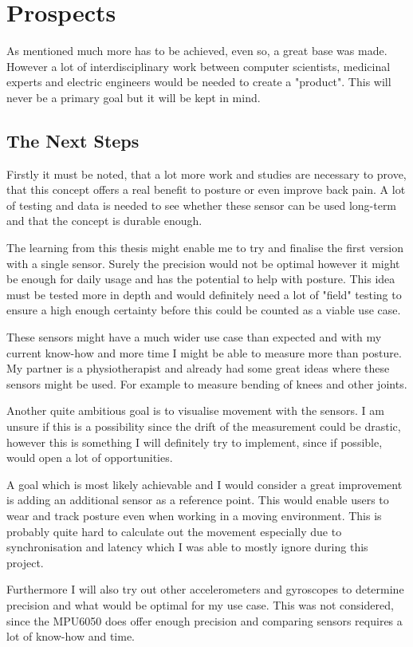 \chapter*{Prospects}
\label{chap:Porspects}
\setcounter{section}{0}

As mentioned much more has to be achieved, even so, a great base was made. However a lot of interdisciplinary work between computer scientists, medicinal experts and electric engineers would be needed to create a "product". This will never be a primary goal but it will be kept in mind.

\section{The Next Steps}

Firstly it must be noted, that a lot more work and studies are necessary to prove, that this concept offers a real benefit to posture or even improve back pain. A lot of testing and data is needed to see whether these sensor can be used long-term and that the concept is durable enough.

The learning from this thesis might enable me to try and finalise the first version with a single sensor. Surely the precision would not be optimal however it might be enough for daily usage and has the potential to help with posture.
This idea must be tested more in depth and would definitely need a lot of "field" testing to ensure a high enough certainty before this could be counted as a viable use case.

These sensors might have a much wider use case than expected and with my current know-how and more time I might be able to measure more than posture. My partner is a physiotherapist and already had some great ideas where these sensors might be used. For example to measure bending of knees and other joints. 

Another quite ambitious goal is to visualise movement with the sensors. I am unsure if this is a possibility since the drift of the measurement could be drastic, however this is something I will definitely try to implement, since if possible, would open a lot of opportunities.

A goal which is most likely achievable and I would consider a great improvement is adding an additional sensor as a reference point. This would enable users to wear and track posture even when working in a moving environment. This is probably quite hard to calculate out the movement especially due to synchronisation and latency which I was able to mostly ignore during this project.

Furthermore I will also try out other accelerometers and gyroscopes to determine precision and what would be optimal for my use case. This was not considered, since the MPU6050 does offer enough precision and comparing sensors requires a lot of know-how and time.